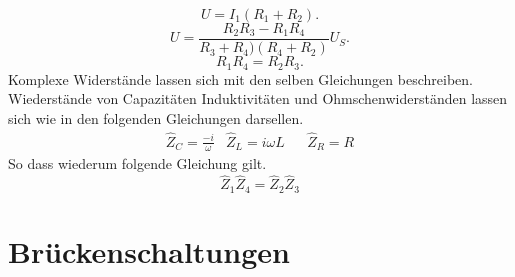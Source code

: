 \begin{equation}
  U=I_1 (R_1 + R_2)   .
\end{equation}
\begin{equation}
  U=\frac{R_2 R_3 - R_1 R_4}{R_3 + R_4)(R_4 + R_2) }U_S   .
\end{equation}
\begin{equation}
  R_1 R_4 =R_2 R_3   .
  \label{eq:Widerstand}
\end{equation}
Komplexe Widerstände lassen sich mit den selben Gleichungen beschreiben.
Wiederstände von Capazitäten Induktivitäten und Ohmschenwiderständen lassen sich
wie in den folgenden Gleichungen darsellen.
\begin{align}
&\hat{Z}_C = \frac{-i}{\omega}  &  \hat{Z}_L=i\omega L & & \hat{Z}_R = R &
\end{align}
So dass wiederum folgende Gleichung gilt.
\begin{equation}
\hat{Z}_1\hat{Z}_4=\hat{Z}_2\hat{Z}_3
\end{equation}
\section{Brückenschaltungen}
